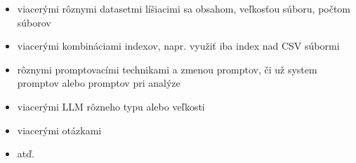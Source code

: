 \begin{itemize}
\item viacerými rôznymi datasetmi líšiacimi sa obsahom, veľkosťou súboru, počtom súborov
\item viacerými kombináciami indexov, napr. využiť iba index nad CSV súbormi
\item rôznymi promptovacími technikami a zmenou promptov, či už system promptov alebo promptov pri analýze
\item viacerými LLM rôzneho typu alebo veľkosti
\item viacerými otázkami
\item atď.
\end{itemize}
